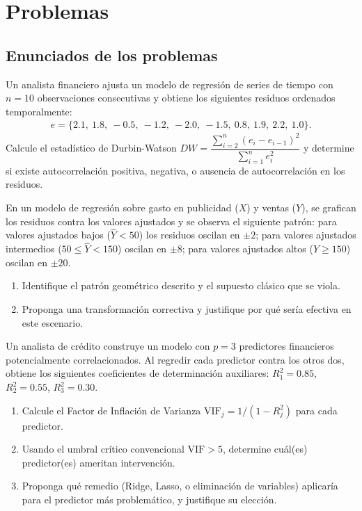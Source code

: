 \section*{Problemas}

\subsection*{Enunciados de los problemas}

\begin{problema}
	\label{prob:c7c2f12}
	Un analista financiero ajusta un modelo de regresión de series de tiempo con $n = 10$ observaciones consecutivas y obtiene los siguientes residuos ordenados temporalmente:
	\begin{align}
		e = \{2.1,\ 1.8,\ -0.5,\ -1.2,\ -2.0,\ -1.5,\ 0.8,\ 1.9,\ 2.2,\ 1.0\}.
	\end{align}
	Calcule el estadístico de Durbin-Watson $DW = \dfrac{\sum_{i=2}^n (e_i - e_{i-1})^2}{\sum_{i=1}^n e_i^2}$ y determine si existe autocorrelación positiva, negativa, o ausencia de autocorrelación en los residuos.
\end{problema}

\begin{problema}
	\label{prob:90810fe}
	En un modelo de regresión sobre gasto en publicidad ($X$) y ventas ($Y$), se grafican los residuos contra los valores ajustados y se observa el siguiente patrón: para valores ajustados bajos ($\hat{Y} < 50$) los residuos oscilan en $\pm 2$; para valores ajustados intermedios ($50 \leq \hat{Y} < 150$) oscilan en $\pm 8$; para valores ajustados altos ($\hat{Y} \geq 150$) oscilan en $\pm 20$.
	\begin{enumerate}
		\item Identifique el patrón geométrico descrito y el supuesto clásico que se viola.
		\item Proponga una transformación correctiva y justifique por qué sería efectiva en este escenario.
	\end{enumerate}
\end{problema}

\begin{problema}
	\label{prob:46ca545}
	Un analista de crédito construye un modelo con $p = 3$ predictores financieros potencialmente correlacionados. Al regredir cada predictor contra los otros dos, obtiene los siguientes coeficientes de determinación auxiliares: $R_1^2 = 0.85$, $R_2^2 = 0.55$, $R_3^2 = 0.30$.
	\begin{enumerate}
		\item Calcule el Factor de Inflación de Varianza $\text{VIF}_j = 1/(1-R_j^2)$ para cada predictor.
		\item Usando el umbral crítico convencional $\text{VIF} > 5$, determine cuál(es) predictor(es) ameritan intervención.
		\item Proponga qué remedio (Ridge, Lasso, o eliminación de variables) aplicaría para el predictor más problemático, y justifique su elección.
	\end{enumerate}
\end{problema}


